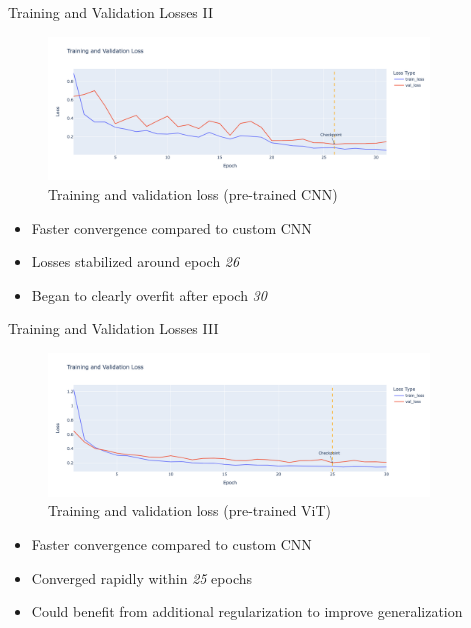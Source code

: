 \documentclass{beamer}
\begin{document}
\begin{frame}{Training and Validation Losses II}
    \begin{figure}
        \centering
        \includegraphics[width=0.9\textwidth]{../resources/resnet/loss.png}
        \caption{Training and validation loss (pre-trained CNN)}\label{fig:resnet-loss}
    \end{figure}
    \begin{itemize}
        \item Faster convergence compared to custom CNN
        \item Losses stabilized around epoch \textit{26}
        \item Began to clearly overfit after epoch \textit{30}
    \end{itemize}
\end{frame}

\begin{frame}{Training and Validation Losses III}
    \begin{figure}
        \centering
        \includegraphics[width=0.9\textwidth]{../resources/vit/loss.png}
        \caption{Training and validation loss (pre-trained ViT)}\label{fig:vit-loss}
    \end{figure}
    \begin{itemize}
        \item Faster convergence compared to custom CNN
        \item Converged rapidly within \textit{25} epochs
        \item Could benefit from additional regularization to improve generalization
    \end{itemize}
\end{frame}
\end{document}
